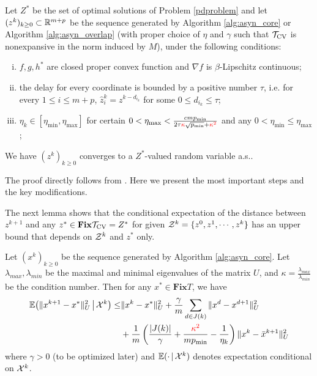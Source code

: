 {\begin{thm}\label{thm:async-convergence2}
Let $Z^*$ be the set of optimal solutions of Problem \eqref{pdproblem} and let $(z^k)_{k\geq0}\subset \mathbb{R}^{m+p}$ be the sequence generated by Algorithm \ref{alg:asyn_core} or Algorithm \ref{alg:asyn_overlap} (with proper choice of $\eta$ and $\gamma$ such that ${{\mathcal{T}}_{\textnormal{CV}}}$ is nonexpansive in the norm induced by $M$), under the following conditions:
\begin{enumerate}[(i)]
\item $f,g,h^*$ are closed proper convex function and $\nabla f$ is $\beta$-Lipschitz continuous;
\item the delay for every coordinate is bounded by a positive number $\tau$, i.e. for every $1\leq i\leq m+p$, $\hat{z}^{k}_{i}=z^{k-d_{i_k}}$ for some $0\leq d_{i_k}\leq\tau$;
\item $\eta_k
\in [\eta_{\min}, \eta_{\max}]$ for certain $0<\eta_{\max}<\frac{cmp_{\min}}{2\tau{\color{red}{\kappa}}
\sqrt{p_{\min}}+{\color{red}{\kappa^2}}}$ and any $0<\eta_{\min}\leq\eta_{\max}$;
\end{enumerate}
We have $(z^k)_{k\geq 0}$ converges to a $Z^*$-valued random variable a.s..
\end{thm} 
The proof directly follows from \cite[Section 3]{Peng_2015_AROCK}. Here we present the most important steps and the key modifications. 
 
The next lemma shows that the conditional expectation of the distance between $z^{k+1}$ 
and any $z^*\in \mathbf{Fix} {{\mathcal{T}}_{\textnormal{CV}}}=Z^*$ for given ${\mathcal{Z}}^k=\{z^0,z^1,\cdots,z^k\}$ has an
upper bound that depends on ${\mathcal{Z}}^k$ and $z^*$ only.
\begin{lemma}\label{lemma:fund}
Let $(x^k)_{k\geq 0}$ be the sequence generated by Algorithm
\ref{alg:asyn_core}. Let $\lambda_{max},\lambda_{min}$ be the
maximal and minimal eigenvalues of the matrix $U$, and
$\kappa=\frac{\lambda_{max}}{\lambda_{min}}$ be the condition number. Then for
any $x^*\in \mathbf{Fix} T$, we have
\begin{align}\label{eqn:fund_inquality0}
\begin{aligned}
\mathbb{E}\big(\|x^{k+1} - x^* \|_U^2 \,\big|\, \cX^k\big)  \leq & \|x^{k} - x^*
\|_U^2  +{\gamma\over m}\sum_{d\in J(k)}\|x^d-x^{d+1}\|_U^2\\
&+ {1\over m}\left({{|J(k)|}\over \gamma}+{{\color{red}{\kappa^2}}\over
mp_{\min}}-{1\over \eta_k}\right)\|x^k-\bar x^{k+1}\|_U^2
\end{aligned}
\end{align}
where $\gamma>0$ (to be optimized later) and $\mathbb{E}(\cdot\,|\,{\mathcal{X}}^k)$ denotes expectation  conditional on ${\mathcal{X}}^k$.
\end{lemma}

}
